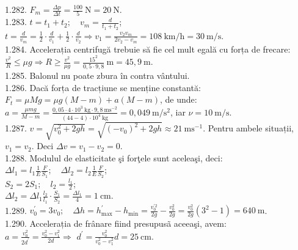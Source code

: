 1.282. $F_{m}=\frac{\Delta p}{\Delta t}=\frac{100}{5} \mathrm{~N}=20 \mathrm{~N}$.\\

1.283. $t=t_{1}+t_{2}; \quad v_{m}=\frac{d}{t_{1}+t_{2}}$;\\ $t=\frac{d}{v_{m}}=\frac{1}{2} \cdot \frac{d}{v_{1}}+\frac{1}{2} \cdot \frac{d}{v_{2}} \Rightarrow v_{1}=\frac{v_{2} v_{m}}{2 v_{2}-v_{m}}=108 \mathrm{~km} / \mathrm{h}=30 \mathrm{~m} / \mathrm{s}$.\\

1.284. Accelerația centrifugă trebuie să fie cel mult egală cu forța de frecare:\\ $\frac{v^{2}}{R} \leq \mu g \Rightarrow R \geq \frac{v^{2}}{\mu g}=\frac{15^{2}}{0,5 \cdot 9,8} \mathrm{~m}=45,9 \mathrm{~m}$.\\

1.285. Balonul nu poate zbura în contra vântului.\\

1.286. Dacă forța de tracțiune se menține constantă:\\ $F_{t}=\mu M g=\mu g(M-m)+a(M-m)$, de unde:\\ $a=\frac{\mu m g}{M-m}=\frac{0,05 \cdot 4 \cdot 10^{3} \mathrm{~kg} \cdot 9,8 \mathrm{~ms}^{-2}}{(44-4) \cdot 10^{4} \mathrm{~kg}}=0,049 \mathrm{~m} / \mathrm{s}^{2}$, iar $\nu=10 \mathrm{~m} / \mathrm{s}$.\\

1.287. $v=\sqrt{v_{0}^{2}+2 g h}=\sqrt{\left(-v_{0}\right)^{2}+2 g h} \approx 21 \mathrm{~ms}^{-1}$. Pentru ambele situații, $v_{1}=v_{2}$. Deci $\Delta v=v_{1}-v_{2}=0$.\\

1.288. Modulul de elasticitate şi forţele sunt aceleaşi, deci:\\ $\Delta l_{1}=l_{1} \frac{1}{E} \frac{F}{S_{1}}; \quad \Delta l_{2}=l_{2} \frac{1}{E} \frac{F}{S_{2}}$;\\ $S_{2}=2 S_{1}; \quad l_{2}=\frac{l_{1}}{2}$;\\ $\Delta l_{2}=\Delta l_{1} \frac{l_{2}}{l_{1}} \cdot \frac{S_{1}}{S_{2}}=\frac{\Delta l_{1}}{4}=1 \mathrm{~cm}$.\\

1.289. $v_{0}^{\prime}=3 v_{0}; \quad \Delta h=h_{\text {max}}^{\prime}-h_{\text {min}}=\frac{v_{0}^{\prime 2}}{2 g}-\frac{v_{0}^{2}}{2 g}=\frac{v_{0}^{2}}{2 g}\left(3^{2}-1\right)=640 \mathrm{~m}$.\\

1.290. Accelerația de frânare fiind presupusã aceeaşi, avem:\\ $a=\frac{v_{0}^{2}}{2 d^{\prime}}=\frac{v_{0}^{2}-v_{1}^{2}}{2 d} \Rightarrow$ $d^{\prime}=\frac{v_{0}^{2}}{v_{0}^{2}-v_{1}^{2}} d=25 \mathrm{~cm}$.\\

